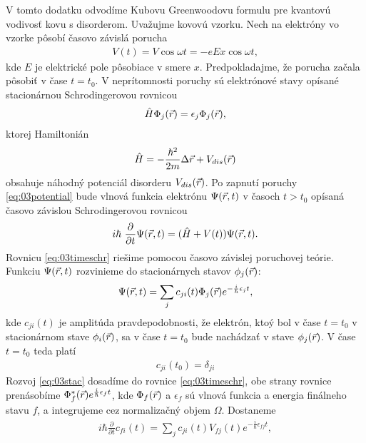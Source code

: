 V tomto dodatku odvodíme Kubovu Greenwoodovu formulu \cite{Kubo,Mello} pre kvantovú vodivosť kovu s disorderom. Uvažujme kovovú vzorku. Nech na elektróny vo vzorke pôsobí časovo závislá porucha
\begin{align}
\label{eq:03potential}
V(t)=V\cos \omega t = -eEx \cos \omega t \mathrm{,}
\end{align}
kde $E$ je elektrické pole pôsobiace v smere $x$. Predpokladajme, že porucha začala pôsobiť v čase $t=t_0$.
V neprítomnosti poruchy sú elektrónové stavy opísané stacionárnou Schrodingerovou rovnicou
\begin{align}
\label{eq:03schr}
\hat{H} \Phi_j(\vec{r})= \epsilon_j\Phi_j(\vec{r}) \mathrm{,}
\end{align}
ktorej Hamiltonián
\begin{align}
\label{eq:03Hamiltonian}
\hat{H}= - \frac{\hbar^2}{2m}\Delta \vec{r} + V_{dis}(\vec{r}) \mathrm{}
\end{align}
obsahuje náhodný potenciál disorderu $V_{dis}(\vec{r})$. Po zapnutí poruchy \eqref{eq:03potential}
bude vlnová funkcia elektrónu $\Psi(\vec{r},t)$ v časoch $t>t_0$ opísaná časovo závislou Schrodingerovou rovnicou
\begin{align}
\label{eq:03timeschr}
i\hbar\ \frac{\partial}{\partial t} \Psi(\vec{r},t) = (\hat{H} + V(t))\Psi(\vec{r},t)\mathrm{.}
\end{align}
Rovnicu \eqref{eq:03timeschr} riešime pomocou časovo závislej poruchovej teórie. Funkciu $\Psi(\vec{r},t)$ rozvinieme do stacionárnych stavov $\phi_j(\vec{r})$:
\begin{align}
\label{eq:03stac}
\Psi(\vec{r},t)=\sum_j c_{ji}(t)\Phi_j(\vec{r})e^{-\frac{i}{\hbar}\epsilon_jt} \mathrm{,}
\end{align}
kde $c_{ji}(t)$ je amplitúda pravdepodobnosti, že elektrón, ktoý bol v čase $t=t_0$ v stacionárnom stave $\phi_i(\vec{r})$, sa v čase $t=t_0$ bude nachádzať v stave $\phi_j(\vec{r})$. V čase $t=t_0$ teda platí
\begin{align}
\label{eq:03cji0}
c_{ji}(t_0)=\delta_{ji}
\end{align}
Rozvoj \eqref{eq:03stac} dosadíme do rovnice \eqref{eq:03timeschr}, obe strany rovnice prenásobíme $\Phi^{\ast}_f(\vec{r})e^{\frac{i}{\hbar}\epsilon_f t}$, kde $\Phi_f(\vec{r})$ a $\epsilon_f$ sú vlnová funkcia a energia finálneho stavu $f$, a integrujeme cez normalizačný objem $\Omega$.
Dostaneme
\begin{align}
\label{eq:03timeschr_expanded}
i\hbar\frac{\partial}{\partial t}c_{fi}(t)=\sum_j c_{ji}(t) V_{fj}(t)e^{-\frac{i }{\hbar}\epsilon_{fj} t} \mathrm{,}
\end{align}
